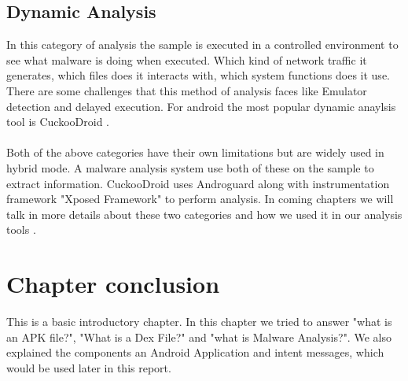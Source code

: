 \documentclass[../main.tex]{subfile}
\begin{document}
		\subsection[Dynamic Analysis]{Dynamic Analysis} In this category of analysis the sample is executed in a controlled environment to see what malware is doing when executed. Which kind of network traffic it generates, which files does it interacts with, which system functions does it use. There are some challenges that this method of analysis faces like Emulator detection and delayed execution. For android the most popular dynamic anaylsis tool is CuckooDroid \cite{cuckoodroid_github}.
		
		\paragraph{} Both of the above categories have their own limitations but are widely used in hybrid mode. A malware analysis system use both of these on the sample to extract information. CuckooDroid uses Androguard along with instrumentation framework "Xposed Framework" to perform analysis. In coming chapters we will talk in more details about these two categories and how we used it in our analysis tools \cite{cuckoodroid_github}.
		\section*{Chapter conclusion} This is a basic introductory chapter. In this chapter we tried to answer "what is an APK file?", "What is a Dex File?" and "what is Malware Analysis?". We also explained the components an Android Application and intent messages, which would be used later in this report.
\end{document}
